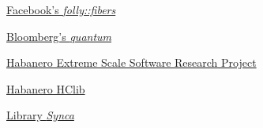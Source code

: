 \begin{thebibliography}{99}
        \href{https://github.com/facebook/folly/tree/master/folly/fibers}
        {Facebook's \emph{folly::fibers}}

        \href{https://github.com/bloomberg/quantum}
        {Bloomberg's \emph{quantum}}

    \href{https://wiki.rice.edu/confluence/display/HABANERO/Habanero+Extreme+Scale+Software+Research+Project}
        {Habanero Extreme Scale Software Research Project}

    \href{https://github.com/habanero-rice/hclib}
        {Habanero HClib}

        \href{https://github.com/gridem/Synca}
        {Library \emph{Synca}}

\end{thebibliography}

